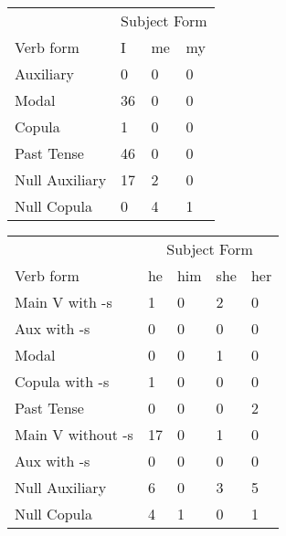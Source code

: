 \begin{table}[]
    \begin{minipage}{0.5\textwidth}
    \centering
    \begin{tabular}{@{}llll@{}}
        \toprule
            &\multicolumn{3}{c}{Subject Form}\\
            \cline{2-4}
        Verb form & I & me & my \\
        \midrule
        Auxiliary & 0 & 0 & 0 \\
        Modal & 36 & 0 & 0 \\
        Copula & 1 & 0 & 0 \\
        Past Tense & 46 & 0 & 0 \\
        \hline
        Null Auxiliary & 17 & 2 & 0 \\
        Null Copula & 0 & 4 & 1 \\
        \bottomrule
    \end{tabular}
\end{minipage}
\begin{minipage}{0.5\textwidth}
    \centering
    \begin{tabular}{@{}lllll@{}}
        \toprule
            &\multicolumn{4}{c}{Subject Form}\\
            \cline{2-5}
        Verb form & he & him & she & her \\
        \midrule
        Main V with -s & 1 & 0 & 2 & 0 \\
        Aux with -s & 0 & 0 & 0 & 0 \\
        Modal & 0 & 0 & 1 & 0 \\
        Copula with -s & 1 & 0 & 0 & 0 \\
        Past Tense & 0 & 0 & 0 & 2 \\
        \hline
        Main V without -s & 17 & 0 & 1 & 0 \\
        Aux with -s & 0 & 0 & 0 & 0 \\
        Null Auxiliary & 6 & 0 & 3 & 5 \\
        Null Copula & 4 & 1 & 0 & 1 \\
        \bottomrule
    \end{tabular}
\end{minipage}
\end{table}
